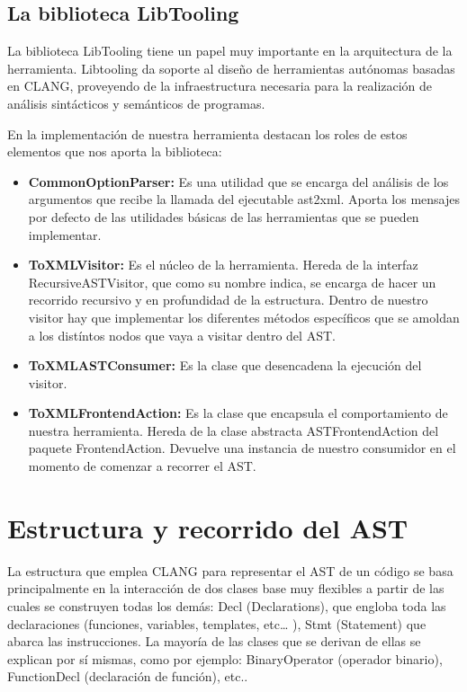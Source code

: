 \subsection{La biblioteca LibTooling}

La biblioteca LibTooling tiene un papel muy importante en la arquitectura de la herramienta. Libtooling da soporte al diseño de herramientas autónomas basadas en CLANG, proveyendo de la infraestructura necesaria para la realización de análisis sintácticos y semánticos de programas.

En la implementación de nuestra herramienta destacan los roles de estos elementos que nos aporta la biblioteca:

\begin{itemize}
\item \textbf{CommonOptionParser:} Es una utilidad que se encarga del análisis de
los argumentos que recibe la llamada del ejecutable ast2xml. Aporta los
mensajes por defecto de las utilidades básicas de las herramientas que
se pueden implementar.
\item \textbf{ToXMLVisitor:} Es el núcleo de la herramienta. Hereda de la interfaz RecursiveASTVisitor, que como su nombre indica, se encarga de hacer un recorrido recursivo y en profundidad de la estructura. Dentro de nuestro visitor hay que implementar los diferentes métodos específicos que se amoldan a los distíntos nodos que vaya a visitar dentro del AST.
\item \textbf{ToXMLASTConsumer:} Es la clase que desencadena la ejecución del visitor.
\item \textbf{ToXMLFrontendAction:} Es la clase que encapsula el comportamiento de nuestra herramienta. Hereda de la clase abstracta ASTFrontendAction del paquete FrontendAction. Devuelve una instancia de nuestro consumidor en el momento de comenzar a recorrer el AST.
\end{itemize}

\section{Estructura y recorrido del AST}

La estructura que emplea CLANG para representar el AST de un código se basa principalmente en la interacción de dos clases base muy flexibles a partir de las cuales se construyen todas los demás: Decl (Declarations), que engloba toda las declaraciones (funciones, variables, templates, etc… ), Stmt (Statement) que abarca las instrucciones. La mayoría de las clases que se derivan de ellas se explican por sí mismas, como por ejemplo: BinaryOperator (operador binario), FunctionDecl (declaración de función), etc..

